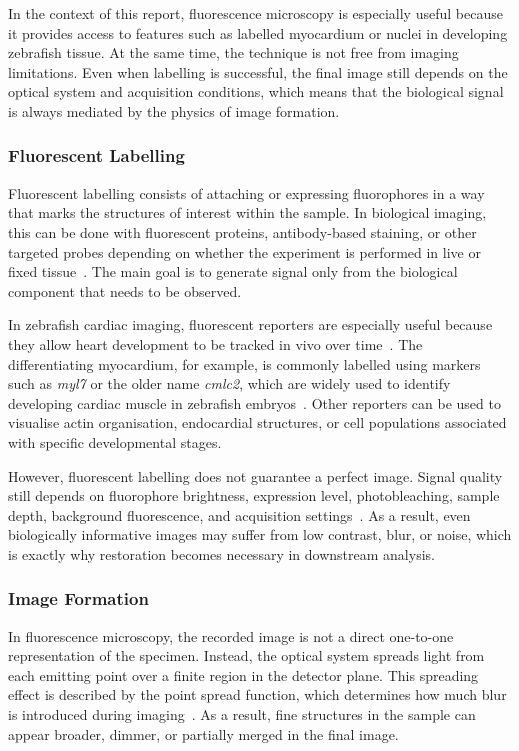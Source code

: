 In the context of this report, fluorescence microscopy is especially useful because it provides access to features such as labelled myocardium or nuclei in developing zebrafish tissue. At the same time, the technique is not free from imaging limitations. Even when labelling is successful, the final image still depends on the optical system and acquisition conditions, which means that the biological signal is always mediated by the physics of image formation.

\subsubsection{Fluorescent Labelling}

Fluorescent labelling consists of attaching or expressing fluorophores in a way that marks the structures of interest within the sample. In biological imaging, this can be done with fluorescent proteins, antibody-based staining, or other targeted probes depending on whether the experiment is performed in live or fixed tissue~\cite{...}. The main goal is to generate signal only from the biological component that needs to be observed.

In zebrafish cardiac imaging, fluorescent reporters are especially useful because they allow heart development to be tracked in vivo over time~\cite{...}. The differentiating myocardium, for example, is commonly labelled using markers such as \textit{myl7} or the older name \textit{cmlc2}, which are widely used to identify developing cardiac muscle in zebrafish embryos~\cite{...}. Other reporters can be used to visualise actin organisation, endocardial structures, or cell populations associated with specific developmental stages.

However, fluorescent labelling does not guarantee a perfect image. Signal quality still depends on fluorophore brightness, expression level, photobleaching, sample depth, background fluorescence, and acquisition settings~\cite{...}. As a result, even biologically informative images may suffer from low contrast, blur, or noise, which is exactly why restoration becomes necessary in downstream analysis.

\subsubsection{Image Formation}

In fluorescence microscopy, the recorded image is not a direct one-to-one representation of the specimen. Instead, the optical system spreads light from each emitting point over a finite region in the detector plane. This spreading effect is described by the point spread function, which determines how much blur is introduced during imaging~\cite{...}. As a result, fine structures in the sample can appear broader, dimmer, or partially merged in the final image.

